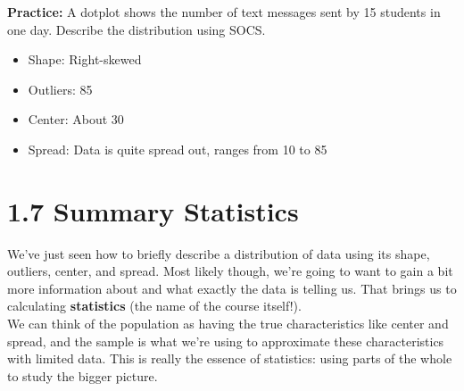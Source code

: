 \textbf{Practice:} A dotplot shows the number of text messages sent by 15 students in one day. Describe the distribution using SOCS.
\begin{center}
\end{center}
\begin{itemize}
    \item Shape: Right-skewed
    \item Outliers: 85
    \item Center: About 30
    \item Spread: Data is quite spread out, ranges from 10 to 85
\end{itemize} 
\bigskip


\section*{1.7 Summary Statistics}
We've just seen how to briefly describe a distribution of data using its shape, outliers, center, and spread. Most likely though, we're going to want to gain a bit more information about and what exactly the data is telling us. That brings us to calculating \textbf{statistics} (the name of the course itself!). \\

We can think of the population as having the true characteristics like center and spread, and the sample is what we're using to approximate these characteristics with limited data. This is really the essence of statistics: using parts of the whole to study the bigger picture. \\

